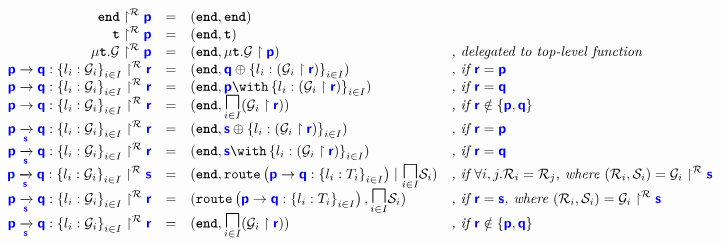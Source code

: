 \documentclass{article}
\begin{document}
\doublespacing
\[
\begin{array}{>{\displaystyle}rc>{\displaystyle}l>{\displaystyle}l}
	\projroute{\tyend}{p} & = & (\tyend, \tyend) & \\
	\projroute{\tyrecvar}{p} & = & (\tyend, \tyrecvar) & \\
	\projroute{\tyrec{\newglobal}}{p} & = & (\tyend, \proj{\tyrec{\newglobal}}{p}) & \textit{, delegated to top-level function} \\
	\projroute{\gcomm{p}{q}{l_i: \newglobal_i}{i \in I}}{r} & = & (\tyend, \tysel{q}{l_i: \left(\proj{\newglobal_i}{r}\right)}{i \in I}) & \textit{, if } \role{r} = \role{p} \\
	\projroute{\gcomm{p}{q}{l_i: \newglobal_i}{i \in I}}{r} & = & (\tyend, \tybra{p}{l_i: \left(\proj{\newglobal_i}{r}\right)}{i \in I}) & \textit{, if } \role{r} = \role{q} \\
	\projroute{\gcomm{p}{q}{l_i: \newglobal_i}{i \in I}}{r} & = & (\tyend, \underset{i \in I}{\tyMERGEOP}(\proj{\newglobal_i}{r})) & \textit{, if } \role{r} \notin \{\role{p}, \role{q}\} \\
	\projroute{\gcommroute{p}{q}{s}{l_i: \newglobal_i}{i \in I}}{r} & = & (\tyend, \tysel{s}{l_i: \left(\proj{\newglobal_i}{r}\right)}{i \in I}) & \textit{, if } \role{r} = \role{p} \\
	\projroute{\gcommroute{p}{q}{s}{l_i: \newglobal_i}{i \in I}}{r} & = & (\tyend, \tybra{s}{l_i: \left(\proj{\newglobal_i}{r}\right)}{i \in I}) & \textit{, if } \role{r} = \role{q} \\
	\projroute{\gcommroute{p}{q}{s}{l_i: \newglobal_i}{i \in I}}{s} & = & (\tyend, \tyroutepar{\tyroute{p}{q}{l_i: T_i}{i \in I}}{\underset{i \in I}{\tyMERGEOP}\newlocal_i}) & \textit{, if } \forall i, j. \newroute_i = \newroute_j \textit{, where } (\newroute_i, \newlocal_i) = \projroute{\newglobal_i}{s} \\
	\projroute{\gcommroute{p}{q}{s}{l_i: \newglobal_i}{i \in I}}{r} & = & (\tyroute{p}{q}{l_i: T_i}{i \in I}, \underset{i \in I}{\tyMERGEOP}\newlocal_i) & \textit{, if } \role{r} = \role{s} \textit{, where } (\newroute_i, \newlocal_i) = \projroute{\newglobal_i}{s} \\

	\projroute{\gcommroute{p}{q}{s}{l_i: \newglobal_i}{i \in I}}{r} & = & (\tyend, \underset{i \in I}{\tyMERGEOP}(\proj{\newglobal_i}{r})) & \textit{, if } \role{r} \notin \{\role{p}, \role{q}\} \\
\end{array}
\]
\singlespacing
\end{document}
